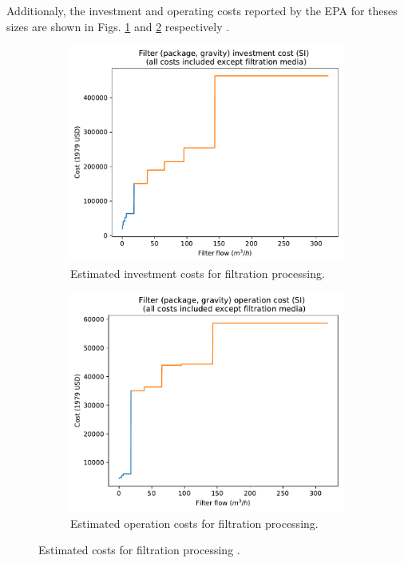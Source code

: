 \documentclass[10pt,a4paper]{article}
\begin{document}
Additionaly, the investment and operating costs reported by the EPA for theses sizes are shown in Figs. \ref{fig:filter_investment_costs} and \ref{fig:filter_operating_costs} respectively \cite{EPAWWTPCosts_V2, EPAWWTPCosts_V3}.
\begin{figure}[H]
	\begin{subfigure}[t]{0.5\linewidth}
		\includegraphics[width=\linewidth]{filter_pressure_gravity_investment_cost_m} 
		\caption{Estimated investment costs for filtration processing.}
		\label{fig:filter_investment_costs}
	\end{subfigure}
	\quad
	\begin{subfigure}[t]{0.5\linewidth}
		\includegraphics[width=\linewidth]{filter_pressure_gravity_operation_cost_m}
		\caption{Estimated operation costs for filtration processing.}
		\label{fig:filter_operating_costs}
	\end{subfigure}
	
	\caption{Estimated costs for filtration processing \cite{EPAWWTPCosts_V2, EPAWWTPCosts_V3}.}
	\label{fig:filtration_costs}
\end{figure}
\end{document}
